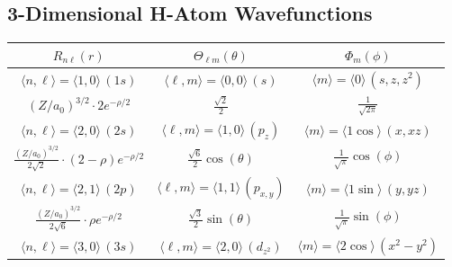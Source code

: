 \documentclass[10pt]{article}
\begin{document}
\newpage 
\subsection{3-Dimensional H-Atom Wavefunctions}
\begin{table}[htbp]\renewcommand{\arraystretch}{1.5}
    \centering
        \begin{tabular}{ccc}
            \toprule

                $R_{n\ell}(r)$ & $\Theta_{\ell m}(\theta)$ & $\Phi_{m}(\phi)$ \\
                
                \midrule
                
                $\langle n,\ell\rangle = \langle 1,0\rangle \, (1s)$ & $\langle \ell,m \rangle = \langle 0,0\rangle \, (s)$ & $\langle m \rangle= \langle 0\rangle \, (s,z,z^2)$ \\[1ex]
                
                $(Z/a_0)^{3/2}\cdot 2e^{-\rho/2}$ & $\displaystyle\frac{\sqrt{2}}{2}$ & $\displaystyle\frac{1}{\sqrt{2\pi}}$\\
                
                \midrule
                
                $\langle n,\ell\rangle = \langle 2,0\rangle \, (2s) $ & $\langle \ell,m \rangle = \langle 1,0\rangle \, (p_z)$ & $\langle m \rangle= \langle 1\cos \rangle \, (x,xz)$ \\[1ex]
                
                $\displaystyle\frac{(Z/a_0)^{3/2}}{2\sqrt{2}}\cdot(2-\rho)e^{-\rho/2}$ & $\displaystyle\frac{\sqrt{6}}{2}\cos(\theta)$ & $\displaystyle\frac{1}{\sqrt{\pi}}\cos(\phi)$ \\

                \midrule

                $\langle n,\ell\rangle = \langle 2,1\rangle \, (2p) $ & $\langle \ell,m \rangle = \langle 1,1\rangle \, (p_{x,y})$ & $\langle m \rangle= \langle 1\sin \rangle \, (y,yz)$ \\[1ex]

                $\displaystyle\frac{(Z/a_0)^{3/2}}{2\sqrt{6}}\cdot\rho e^{-\rho/2}$ & $\displaystyle\frac{\sqrt{3}}{2}\sin(\theta)$ & $\displaystyle\frac{1}{\sqrt{\pi}}\sin(\phi)$ \\      

                \midrule

                $\langle n,\ell\rangle = \langle 3,0\rangle \, (3s) $ & $\langle \ell,m \rangle = \langle 2,0\rangle \, (d_{z^2})$ & $\langle m \rangle= \langle 2\cos \rangle \, (x^2-y^2)$ \\[1ex]    


\end{tabular}
\end{table}
\end{document}
